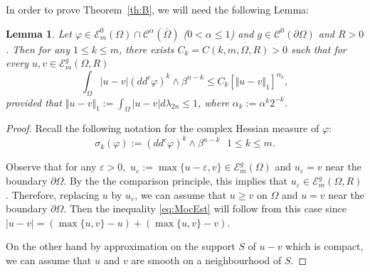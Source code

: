 \documentclass[11pt]{article}
\numberwithin{equation}{section}
\newtheorem{lemma}[theorem]{Lemma}
\theoremstyle{definition}
\newcommand{\Cc}{\mathcal{C}}
\theoremstyle{plain}
\theoremstyle{definition}
\begin{document}
In order to prove Theorem~\ref{th:B}, we will need the following Lemma:
\begin{lemma}\label{lem:ModC}
Let $\varphi\in \mathcal{E}^0_m(\Omega)\cap \Cc^{\alpha} (\overline\Omega)$ ($ 0 < \alpha \leq 1$) and $g \in \Cc^0 (\partial \Omega)$ and $R > 0$.
Then for any $1 \leq k\leq m$, there exists $C_k = C (k,m,\Omega,R) >0$ such that for every $u,v\in \mathcal{E}^g_m(\Omega,R)$
\begin{equation} \label{eq:MocEst}
\int_{\Omega}|u-v|(dd^c\varphi)^k\wedge\beta^{n-k}\leq C_k \left[\Vert u-v \Vert_1\right]^{\alpha_k},
\end{equation}
provided that $\Vert u-v \Vert_1:= \int_{\Omega} \vert u - v\vert d \lambda_{2 n} \leq 1$, where $\alpha_k:= \alpha^k 2^{-k}$.
\end{lemma}
\begin{proof}
Recall the following notation for the complex Hessian measure of $\varphi$:
\[
\sigma_k{(\varphi)}:= (dd^c\varphi)^k\wedge\beta^{n-k} \ \ \ 1 \leq k\leq m.
\]

Observe that for any $\varepsilon > 0,$ $ u_\varepsilon:= \max \{u - \varepsilon, v \} \in \mathcal{E}^g_m(\Omega)$ and $u_\varepsilon = v$ near the boundary $\partial \Omega$. By the the comparison principle, this implies that
$u_\varepsilon \in \mathcal{E}^g_m(\Omega,R)$. Therefore, replacing $u$ by $u_\varepsilon$, we can assume that $u \geq v$ on $\Omega$ and $u = v$ near the boundary $\partial \Omega$. Then the inequality \eqref{eq:MocEst} will follow from this case since $\vert u - v \vert = ( \max\{u,v\} - u) + (\max\{u,v\} - v)$.

On the other hand by approximation on the support $S$ of $u-v$ which is compact, we can assume that $u$ and $ v $ are smooth on a neighbourhood of $S$.


\end{proof}
\end{document}
